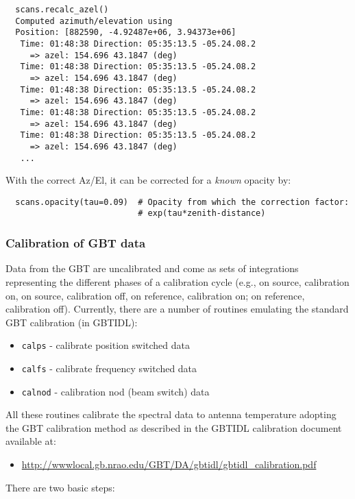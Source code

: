 \small
\begin{verbatim}
  scans.recalc_azel()
  Computed azimuth/elevation using 
  Position: [882590, -4.92487e+06, 3.94373e+06]
   Time: 01:48:38 Direction: 05:35:13.5 -05.24.08.2
     => azel: 154.696 43.1847 (deg)
   Time: 01:48:38 Direction: 05:35:13.5 -05.24.08.2
     => azel: 154.696 43.1847 (deg)
   Time: 01:48:38 Direction: 05:35:13.5 -05.24.08.2
     => azel: 154.696 43.1847 (deg)
   Time: 01:48:38 Direction: 05:35:13.5 -05.24.08.2
     => azel: 154.696 43.1847 (deg)
   Time: 01:48:38 Direction: 05:35:13.5 -05.24.08.2
     => azel: 154.696 43.1847 (deg)
   ...
\end{verbatim}
\normalsize


With the correct Az/El, it can be corrected for a {\it known}
opacity by:

\small
\begin{verbatim}
  scans.opacity(tau=0.09)  # Opacity from which the correction factor: 
                           # exp(tau*zenith-distance)
\end{verbatim}
\normalsize


\subsubsection{Calibration of GBT data}
\label{subsubsection:sd.asap.calib.gbt}

Data from the GBT are uncalibrated and come as sets of integrations
representing the different phases of a calibration cycle (e.g., on
source, calibration on, on source, calibration off, on reference,
calibration on; on reference, calibration off). Currently, there are a
number of routines emulating the standard GBT calibration (in GBTIDL):
\begin{itemize}
   \item {\tt calps} - calibrate position switched data
   \item {\tt calfs} - calibrate frequency switched data
   \item {\tt calnod} - calibration nod (beam switch) data
\end{itemize}

All these routines calibrate the spectral data to antenna temperature
adopting the GBT calibration method as described in the
GBTIDL calibration document available at: 
\begin{itemize}
   \item \url{http://wwwlocal.gb.nrao.edu/GBT/DA/gbtidl/gbtidl_calibration.pdf}
\end{itemize}
There are two basic steps:

